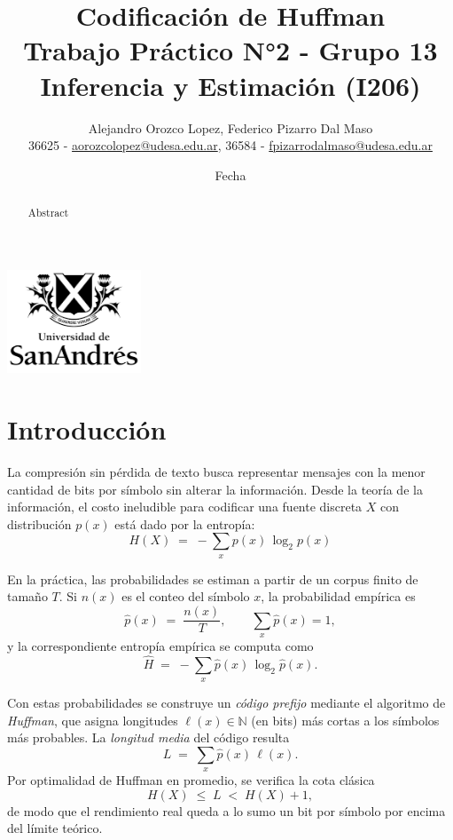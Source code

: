 \documentclass[12pt, a4paper]{article}
\title{Codificación de Huffman\\[2ex]\large Trabajo Práctico N°2 - Grupo 13\\[2ex]Inferencia y Estimación (I206)}
\author{Alejandro Orozco Lopez, Federico Pizarro Dal Maso\\[1ex]\small{36625 - \href{mailto:aorozcolopez@udesa.edu.ar}{aorozcolopez@udesa.edu.ar}, 36584 - \href{mailto:fpizarrodalmaso@udesa.edu.ar}{fpizarrodalmaso@udesa.edu.ar}}}
\date{Fecha}
\begin{document}
\captionsetup[subfloat]{captionskip=0pt}

\setlength{\parskip}{1em}

\captionsetup[table]{name=Tabla}

\maketitle

\begin{center}
    {\includegraphics[width=0.3\textwidth]{udesa_logo.png}}
\end{center}

\begin{abstract}
    
Abstract
\end{abstract}

\section*{Introducción}

La compresión sin pérdida de texto busca representar mensajes con la menor cantidad de bits por símbolo sin alterar la información. Desde la teoría de la información, el costo ineludible para codificar una fuente discreta \(X\) con distribución \(p(x)\) está dado por la entropía:
\[
H(X) \;=\; -\sum_{x} p(x)\,\log_2 p(x)
\]

En la práctica, las probabilidades se estiman a partir de un corpus finito de tamaño \(T\). Si \(n(x)\) es el conteo del símbolo \(x\), la probabilidad empírica es
\[
\hat p(x) \;=\; \frac{n(x)}{T},
\qquad
\sum_x \hat p(x)=1,
\]
y la correspondiente entropía empírica se computa como
\[
\hat H \;=\; -\sum_{x} \hat p(x)\,\log_2 \hat p(x).
\]

Con estas probabilidades se construye un \emph{código prefijo} mediante el algoritmo de \emph{Huffman}, que asigna longitudes \(\ell(x)\in\mathbb{N}\) (en bits) más cortas a los símbolos más probables. La \emph{longitud media} del código resulta
\[
L \;=\; \sum_{x} \hat p(x)\,\ell(x).
\]
Por optimalidad de Huffman en promedio, se verifica la cota clásica
\[
H(X) \;\le\; L \;<\; H(X)+1,
\]
de modo que el rendimiento real queda a lo sumo un bit por símbolo por encima del límite teórico.
\end{document}
